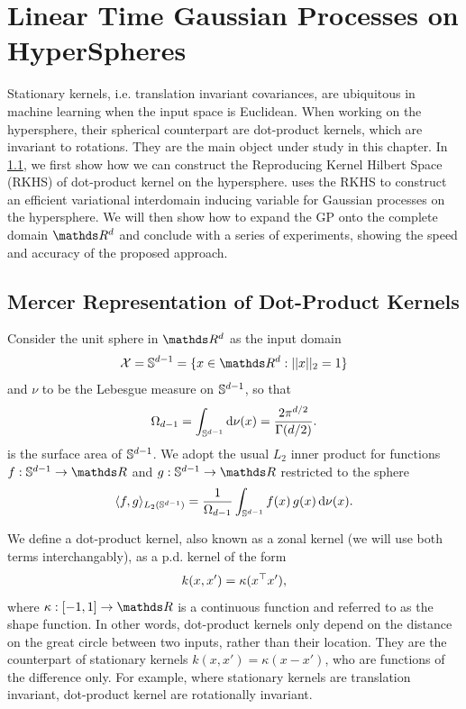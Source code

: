 \ifpdf
    \graphicspath{{Chapter3/Figs/Vector/}{Chapter3/Figs/PDF/}{Chapter3/Figs/}}
\else
    \graphicspath{{Chapter3/Figs/Raster/}{Chapter3/Figs/}}
\fi


\chapter{Linear Time Gaussian Processes on HyperSpheres}
\label{chapter:vish}

Stationary kernels, i.e. translation invariant covariances, are ubiquitous in machine learning when the input space is Euclidean. When working on the hypersphere, their spherical counterpart are dot-product kernels, which are invariant to rotations. They are the main object under study in this chapter. In \cref{sec:rkhs-dotproduct-kernels}, we first show how we can construct the Reproducing Kernel Hilbert Space (RKHS) of dot-product kernel on the hypersphere.  uses the RKHS to construct an efficient variational interdomain inducing variable for Gaussian processes on the hypersphere. We will then show how to expand the GP onto the complete domain $\Reals^d$ and conclude with a series of experiments, showing the speed and accuracy of the proposed approach.

\section{Mercer Representation of Dot-Product Kernels}
\label{sec:rkhs-dotproduct-kernels}

Consider the unit sphere in $\Reals^d$  as the input domain
\begin{equation}
    \mathcal{X} = \dsphere = \{x \in \Reals^d: \norm{x}_2 = 1\}
\end{equation}
and $\nu$ to be the Lebesgue measure on $\mathbb{S}^{d-1}$, so that
\begin{equation}
    \Omega_{d-1} = \int_{\mathbb{S}^{d-1}} \mathrm{d}{\nu(x)} = \frac{2 \pi ^ {d/2}}{\Gamma(d/2)}.
\end{equation}
is the surface area of $\mathbb{S}^{d-1}$. We adopt the usual $L_2$ inner product for functions $f: \dsphere \rightarrow \Reals$ and $g: \dsphere \rightarrow \Reals$ restricted to the sphere 
\begin{equation}
     \langle f, g\rangle_{L_{2}(\mathbb{S}^{d-1})} = \frac{1}{\Omega_{d-1}} \int_{\mathbb{S}^{d-1}} f(x)\,g(x) \, \mathrm{d}{\nu(x)}.
\end{equation}

We define a dot-product kernel, also known as a zonal kernel (we will use both terms interchangably), as a p.d. kernel of the form
\begin{equation}
    k(x, x') = \kappa(x^{\top} x'),
\end{equation}
where $\kappa: [-1, 1] \rightarrow \Reals$ is a continuous function and referred to as the shape function. In other words, dot-product kernels only depend on the distance on the great circle between two inputs, rather than their location. They are the counterpart of stationary kernels $k(x, x') = \kappa(x - x')$, who are functions of the difference only. For example, where stationary kernels are translation invariant, dot-product kernel are rotationally invariant.

